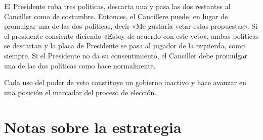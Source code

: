 \documentclass[13pt,a4paper,twocolumn,titlepage]{scrartcl}
\begin{document}
	El Presidente roba tres políticas, descarta una y pasa las dos restantes al Canciller como de costumbre. Entonces, el Cancillere puede, en lugar de promulgar una de las dos políticas, decir «Me gustaría vetar estas propuestas». Si el presidente consiente diciendo «Estoy de acuerdo con este veto», ambas políticas se descartan y la placa de Presidente se pasa al jugador de la izquierda, como siempre.  Si el Presidente no da su consentimiento, el Canciller debe promulgar una de las dos políticas como hace normalmente.
	
	Cada uso del poder de veto constituye un gobierno inactivo y hace avanzar en una posición el marcador del proceso de elección.
	
	\section*{Notas sobre la estrategia}
\end{document}
